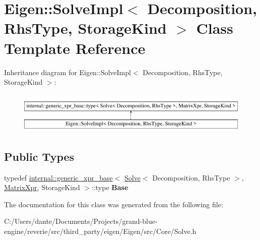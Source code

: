 \hypertarget{class_eigen_1_1_solve_impl}{}\section{Eigen\+::Solve\+Impl$<$ Decomposition, Rhs\+Type, Storage\+Kind $>$ Class Template Reference}
\label{class_eigen_1_1_solve_impl}
Inheritance diagram for Eigen\+::Solve\+Impl$<$ Decomposition, Rhs\+Type, Storage\+Kind $>$\+:\begin{figure}[H]
\begin{center}
\leavevmode
\includegraphics[height=1.989343cm]{class_eigen_1_1_solve_impl}
\end{center}
\end{figure}
\subsection*{Public Types}
\begin{DoxyCompactItemize}
\item 
\mbox{\label{class_eigen_1_1_solve_impl_a52e8597ff3f81c473f7890daa1b317a5}} 
typedef \mbox{\hyperlink{struct_eigen_1_1internal_1_1generic__xpr__base}{internal\+::generic\+\_\+xpr\+\_\+base}}$<$ \mbox{\hyperlink{class_eigen_1_1_solve}{Solve}}$<$ Decomposition, Rhs\+Type $>$, \mbox{\hyperlink{struct_eigen_1_1_matrix_xpr}{Matrix\+Xpr}}, Storage\+Kind $>$\+::type {\bfseries Base}
\end{DoxyCompactItemize}


The documentation for this class was generated from the following file\+:\begin{DoxyCompactItemize}
\item 
C\+:/\+Users/dante/\+Documents/\+Projects/grand-\/blue-\/engine/reverie/src/third\+\_\+party/eigen/\+Eigen/src/\+Core/Solve.\+h\end{DoxyCompactItemize}
